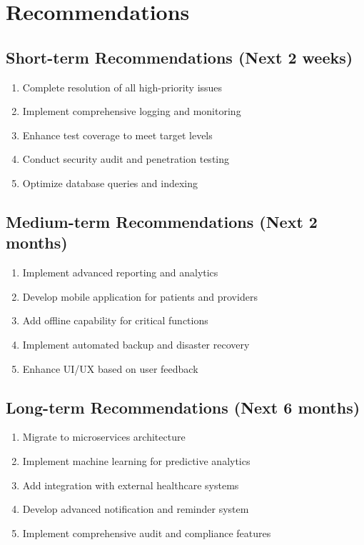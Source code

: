 \documentclass[12pt,a4paper]{article}
\begin{document}
\section{Recommendations}

\subsection{Short-term Recommendations (Next 2 weeks)}

\begin{enumerate}
    \item Complete resolution of all high-priority issues
    \item Implement comprehensive logging and monitoring
    \item Enhance test coverage to meet target levels
    \item Conduct security audit and penetration testing
    \item Optimize database queries and indexing
\end{enumerate}

\subsection{Medium-term Recommendations (Next 2 months)}

\begin{enumerate}
    \item Implement advanced reporting and analytics
    \item Develop mobile application for patients and providers
    \item Add offline capability for critical functions
    \item Implement automated backup and disaster recovery
    \item Enhance UI/UX based on user feedback
\end{enumerate}

\subsection{Long-term Recommendations (Next 6 months)}

\begin{enumerate}
    \item Migrate to microservices architecture
    \item Implement machine learning for predictive analytics
    \item Add integration with external healthcare systems
    \item Develop advanced notification and reminder system
    \item Implement comprehensive audit and compliance features
\end{enumerate}
\end{document}
